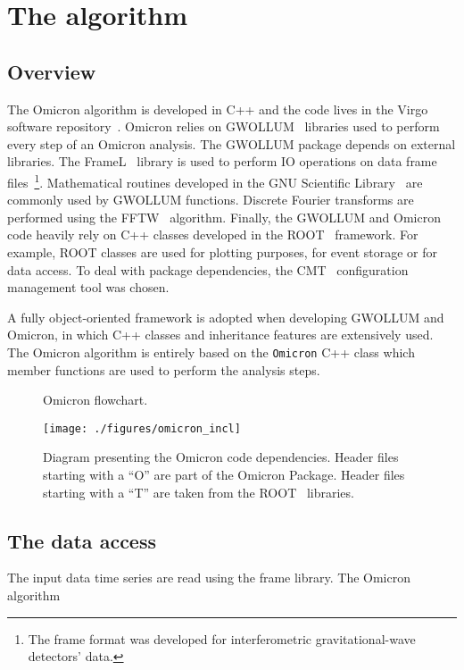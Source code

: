 \section{The algorithm} \label{sec:algorithm}

\subsection{Overview} \label{sec:algorithm:overview}
The Omicron algorithm is developed in C++ and the code lives in the Virgo software repository~\cite{VirgoSVN}. Omicron relies on GWOLLUM~\cite{GWOLLUM} libraries used to perform every step of an Omicron analysis. The GWOLLUM package depends on external libraries. The FrameL~\cite{FrameL} library is used to perform IO operations on data frame files~\footnote{The frame format was developed for interferometric gravitational-wave detectors' data.}. Mathematical routines developed in the GNU Scientific Library~\cite{GSL} are commonly used by GWOLLUM functions. Discrete Fourier transforms are performed using the FFTW~\cite{FFTW} algorithm. Finally, the GWOLLUM and Omicron code heavily rely on C++ classes developed in the ROOT~\cite{Brun:1997pa} framework. For example, ROOT classes are used for plotting purposes, for event storage or for data access. To deal with package dependencies, the CMT~\cite{CMT} configuration management tool was chosen.

A fully object-oriented framework is adopted when developing GWOLLUM and Omicron, in which C++ classes and inheritance features are extensively used. The Omicron algorithm is entirely based on the \texttt{Omicron} C++ class which member functions are used to perform the analysis steps.


\begin{figure}
  \center
  \caption{Omicron flowchart.}
  \label{fig:omicron_flowchart}
\end{figure}

\begin{figure}
  \center
  \texttt{[image: ./figures/omicron\_incl]}
  \caption{Diagram presenting the Omicron code dependencies. Header files starting with a ``O'' are part of the Omicron Package. Header files starting with a ``T'' are taken from the ROOT~\cite{Brun:1997pa} libraries. }
  \label{fig:omicron_incl}
\end{figure}




\subsection{The data access} \label{sec:algorithm:data}
The input data time series are read using the frame library. The Omicron algorithm

